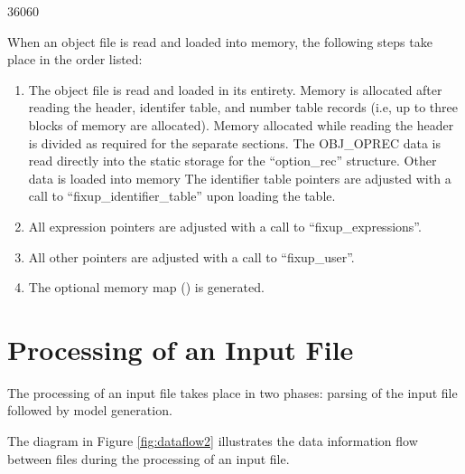 \startfig
\begin{fast_picture}{360}{60}
\savBboxpos
\nextBbox
\nextBbox
\end{fast_picture}


When an object file is read and loaded into memory, the following steps
take place in the order listed:

\begin{enumerate}
\item The object file is read and loaded in its entirety.  Memory is
      allocated after reading the header, identifer table, and number
      table records (i.e, up to three blocks of memory are allocated).
      Memory allocated while reading the header is divided as required
      for the separate sections.
      The OBJ\_OPREC data is read directly into the static storage for
      the ``option\_rec'' structure.   Other data is loaded into memory
      The identifier table pointers are adjusted with a call to
      ``fixup\_identifier\_table'' upon loading the table.
\item All expression pointers are adjusted with a call to ``fixup\_expressions''.
\item All other pointers are adjusted with a call to ``fixup\_user''.
\item The optional memory map () is generated.
\end{enumerate}


\section{Processing of an Input File}
\label{chap:process}

The processing of an  input file takes place in two phases:
parsing of the input file followed by model generation.

The diagram in Figure \ref{fig:dataflow2}
illustrates the data information flow between
files during the processing of an  input file.

